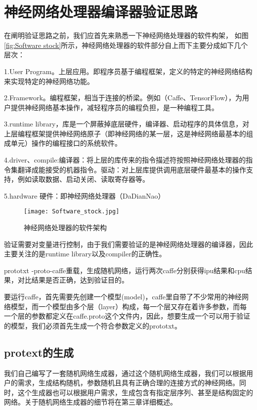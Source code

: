 \chapter{神经网络处理器编译器验证思路}

在阐明验证思路之前，我们应首先来熟悉一下神经网络处理器的软件构架， 如图\autoref{fig:Software stock}所示，神经网络处理器的软件部分自上而下主要分成如下几个层次：

1.User Program。上层应用。即程序员基于编程框架，定义的特定的神经网络结构来实现特定的神经网络功能。

2.Framework。编程框架，相当于连接的桥梁。例如（Caffe、TensorFlow），为用户提供神经网络基本操作，减轻程序员的编程负担，是一种编程工具。

3.runtime library，库是一个屏蔽掉底层硬件，编译器、启动程序的具体信息，对上层编程框架提供神经网络原子（即神经网络的某一层，这是神经网络最基本的组成单元）操作的编程接口的系统软件。

4.driver、compile:编译器：将上层的库传来的指令描述符按照神经网络处理器的指令集翻译成能接受的机器指令。驱动：对上层库提供调用底层硬件最基本的操作支持，例如读取数据、启动关闭、读取寄存器等。

5.hardware 硬件：即神经网络处理器（DaDianNao）
\begin{figure}[!htbp]
\centering
\texttt{[image: Software\_stock.jpg]}
\caption{神经网络处理器的软件架构}
\label{fig:Software stock}
\end{figure}

验证需要对变量进行控制，由于我们需要验证的是神经网络处理器的编译器，因此主要关注的是runtime library以及compiler的正确性。

prototxt -proto-caffe重载，生成随机网络，运行两次caffe分别获得ipu结果和cpu结果，对比结果是否正确，达到验证目的。

要运行caffe，首先需要先创建一个模型(model)，caffe里自带了不少常用的神经网络模型，而一个模型由多个层（layer）构成，每一个层又存在着许多参数，而每一个层的参数都定义在caffe.proto这个文件内，因此，想要生成一个可以用于验证的模型，我们必须首先生成一个符合参数定义的prototxt。

\section{protext的生成}
我们自己编写了一套随机网络生成器，通过这个随机网络生成器，我们可以根据用户的需求，生成结构随机，参数随机且具有正确合理的连接方式的神经网络。同时，这个生成器也可以根据用户需求，生成包含有指定层序列、甚至是结构固定的网络。关于随机网络生成器的细节将在第三章详细概述。
